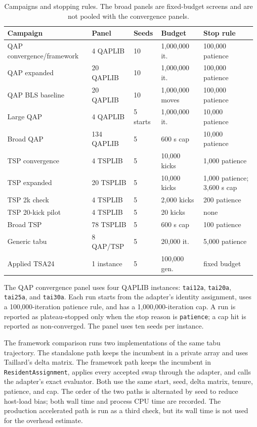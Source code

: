 \documentclass[pdflatex,sn-mathphys-num]{sn-jnl}
\begin{document}
\begin{table}[t]
\centering
\caption{Campaigns and stopping rules. The broad panels are fixed-budget screens and are not pooled
with the convergence panels.}
\label{tab:campaigns}
\small
\tiny
\setlength{\tabcolsep}{2pt}
\begin{tabular}{lllll}
\toprule
Campaign & Panel & Seeds & Budget & Stop rule \\
\midrule
QAP convergence/framework & 4 QAPLIB & 10 & 1,000,000 it. & 100,000 patience \\
QAP expanded & 20 QAPLIB & 10 & 1,000,000 it. & 100,000 patience \\
QAP BLS baseline & 20 QAPLIB & 10 & 1,000,000 moves & 100,000 patience \\
Large QAP & 4 QAPLIB & 5 starts & 1,000,000 it. & 10,000 patience \\
Broad QAP & 134 QAPLIB & 5 & 600 s cap & 10,000 patience \\
TSP convergence & 4 TSPLIB & 5 & 10,000 kicks & 1,000 patience \\
TSP expanded & 20 TSPLIB & 5 & 10,000 kicks & 1,000 patience; 3,600 s cap \\
TSP 2k check & 4 TSPLIB & 5 & 2,000 kicks & 200 patience \\
TSP 20-kick pilot & 4 TSPLIB & 5 & 20 kicks & none \\
Broad TSP & 78 TSPLIB & 5 & 600 s cap & 100 patience \\
Generic tabu & 8 QAP/TSP & 5 & 20,000 it. & 5,000 patience \\
Applied TSA24 & 1 instance & 5 & 100,000 gen. & fixed budget \\
\bottomrule
\end{tabular}
\end{table}

The QAP convergence panel uses four QAPLIB instances: \texttt{tai12a}, \texttt{tai20a},
\texttt{tai25a}, and \texttt{tai30a}. Each run starts from the adapter's identity assignment, uses a
100,000-iteration patience rule, and has a 1,000,000-iteration cap. A run is reported as
plateau-stopped only when the stop reason is \texttt{patience}; a cap hit is reported as
non-converged. The panel uses ten seeds per instance.

The framework comparison runs two implementations of the same tabu trajectory. The standalone path
keeps the incumbent in a private array and uses Taillard's delta matrix. The framework path keeps the
incumbent in \texttt{ResidentAssignment}, applies every accepted swap through the adapter, and calls
the adapter's exact evaluator. Both use the same start, seed, delta matrix, tenure, patience, and cap.
The order of the two paths is alternated by seed to reduce host-load bias; both wall time and process
CPU time are recorded. The production accelerated path is run as a third check, but its wall time is
not used for the overhead estimate.
\end{document}
